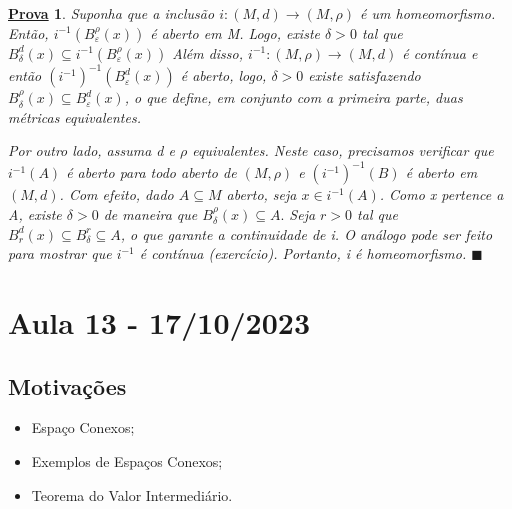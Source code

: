 \documentclass{article}
\newtheorem*{proof*}{\underline{Prova}}
\renewcommand\qedsymbol{$\blacksquare$}
\begin{document}
\begin{proof*}
  Suponha que a inclusão \(i:(M, d)\rightarrow (M, \rho )\) é um homeomorfismo. Então, 
\(i^{-1}(B_{\varepsilon }^{\rho }(x))\) é aberto em M. Logo, existe \(\delta > 0\) tal que 
\(B_{\delta }^{d}(x) \subseteq{i^{-1}(B_{\varepsilon }^{\rho }(x))}\)
Além disso, \(i^{-1}:(M, \rho )\rightarrow (M, d)\) é contínua e então \((i^{-1})^{-1}(B_{\varepsilon }^{d}(x))\)
é aberto, logo, \(\delta >0\) existe satisfazendo \(B_{\delta }^{\rho }(x) \subseteq{B_{\varepsilon }^{d}(x)}\), o 
que define, em conjunto com a primeira parte, duas métricas equivalentes.

  Por outro lado, assuma d e \(\rho \) equivalentes. Neste caso, precisamos verificar
que \(i^{-1}(A)\) é aberto para todo aberto de \((M, \rho) \) e \((i^{-1})^{-1}(B)\) é aberto em \((M, d)\).
Com efeito, dado \(A\subseteq{M}\) aberto, seja \(x\in i^{-1}(A)\). Como x pertence a A, existe \(\delta >0\) de
maneira que \(B_{\delta }^{\rho }(x)\subseteq{A}.\) Seja \(r > 0\) tal que \(B_{r}^{d}(x)\subseteq{B_{\delta }^{r}}\subseteq{A}\),
o que garante a continuidade de i. O análogo pode ser feito para mostrar que \(i^{-1}\) é contínua (exercício).
Portanto, i é homeomorfismo. \qedsymbol
\end{proof*}
\newpage

\section{Aula 13 - 17/10/2023}
\subsection{Motivações}
\begin{itemize}
  \item Espaço Conexos;
  \item Exemplos de Espaços Conexos;
  \item Teorema do Valor Intermediário.
\end{itemize}
\end{document}
